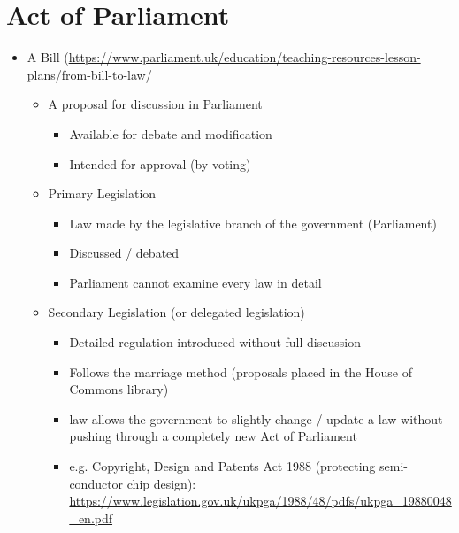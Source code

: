 \documentclass{article}
\begin{document}
\section{Act of Parliament}
\begin{itemize}
\item A Bill (\url{https://www.parliament.uk/education/teaching-resources-lesson-plans/from-bill-to-law/}
\begin{itemize}
\item A proposal for discussion in Parliament 
\begin{itemize}
\item Available for debate and modification
\item Intended for approval (by voting)
\end{itemize}
\item Primary Legislation
\begin{itemize}
\item Law made by the legislative branch of the government (Parliament)
\item Discussed / debated
\item Parliament cannot examine every law in detail
\end{itemize}
\item Secondary Legislation (or delegated legislation)
\begin{itemize}
\item Detailed regulation introduced without full discussion
\item Follows the marriage method (proposals placed in the House of Commons library)
\item law allows the government to slightly change / update a law without pushing through a completely new Act of Parliament
\item e.g. Copyright, Design and Patents Act 1988 (protecting semi-conductor chip design): \url{https://www.legislation.gov.uk/ukpga/1988/48/pdfs/ukpga_19880048_en.pdf}
\end{itemize}
\end{itemize}
\end{itemize}
\end{document}

